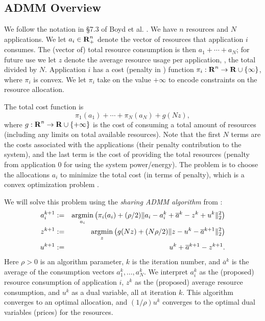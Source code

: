 \subsection{ADMM Overview}

We follow the notation in \S 7.3 of Boyd et al. \cite{ADMM}.
We have $n$ resources and $N$ applications.
We let $a_i \in {\mbox{\textbf{R}}}^n_+$ denote the vector of resources 
that application $i$ consumes.  
The (vector of) total resource consumption is then $a_1 + \cdots + a_N$;
for future use we let $z$ denote the average resource
usage per application, \ie, the total divided by $N$.
Application $i$ has a cost (penalty in \pacora) function $\pi_i:{\mbox{\textbf{R}}}^n \to {\mbox{\textbf{R}}} \cup
\{\infty\}$, where
$\pi_i$ is convex.  We let $\pi_i$ take on the value $+\infty$ to encode
constraints on the resource allocation.

The total cost function is
\[
\pi_1(a_1) + \cdots + \pi_N (a_N) + g(Nz),
\]
where $g: {\mbox{\textbf{R}}}^n \to {\mbox{\textbf{R}}} \cup \{+\infty\}$ is the cost
of consuming a total amount of resources (including any limits on total
available resources).
Note that the first $N$ terms are the costs associated with the
applications (\ie their penalty contribution to the system), and the last term is the cost of providing the total
resources (\ie penalty from application 0 for using the system power/energy).
The problem is to choose the allocations $a_i$ to minimize the total cost (in terms of penalty),
which is a convex optimization problem \cite{BoVa,ADMM}.

We will solve this problem using the \emph{sharing ADMM algorithm}
from \cite{ADMM}:
\begin{eqnarray*}
a_i^{k+1} &:=&  \mathop{\mathrm{argmin}}_{a_i} \left( \pi_i(a_i) + (\rho/2)
\|a_i-a_i^k+\overline a^k-z^k+u^k\|^2_2\right)\\
z^{k+1} &:=&  \mathop{\mathrm{argmin}}_{z} \left( g(Nz) + (N\rho/2)
\|z - u^k - \overline a^{k+1} \|_2^2 \right)\\
u^{k+1} &:=&  u^k + \overline a^{k+1}- z^{k+1}.
\end{eqnarray*}
Here $\rho>0$ is an algorithm parameter,
$k$ is the iteration number,
and $\overline a^k$ is the average of the consumption vectors
$a^k_1, \ldots, a^k_N$.
We interpret $a_i^k$ as the (proposed) resource consumption of 
application $i$,
$z^k$ as the (proposed) average resource consumption,
and $u^k$ as a dual variable, all at iteration $k$.
This algorithm converges to an optimal allocation,
and $(1/\rho)u^k$ converges
to the optimal dual variables (prices) for the resources.

